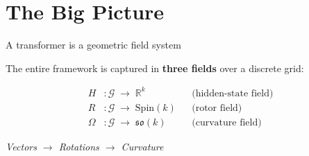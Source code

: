 \documentclass[aspectratio=169, 11pt]{beamer}
\begin{document}
\section{The Big Picture}

\begin{frame}{A transformer is a geometric field system}

The entire framework is captured in \textbf{three fields} over a discrete grid:

\vspace{0.5em}
\[
\begin{aligned}
  H &: \mathcal{G} \;\longrightarrow\; \mathbb{R}^k
    &&\text{(hidden-state field)} \\[6pt]
  R &: \mathcal{G} \;\longrightarrow\; \mathrm{Spin}(k)
    &&\text{(rotor field)} \\[6pt]
  \Omega &: \mathcal{G} \;\longrightarrow\; \mathfrak{so}(k)
    &&\text{(curvature field)}
\end{aligned}
\]

\vspace{0.8em}
\begin{center}
\large\color{Navy}
\emph{Vectors \;\;$\longrightarrow$\;\; Rotations \;\;$\longrightarrow$\;\; Curvature}
\end{center}
\end{frame}
\end{document}
